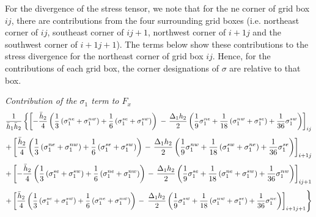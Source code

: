 For the divergence of the stress tensor, we note that for the ne
corner of grid box $ij$, there are contributions from the four
surrounding grid boxes (i.e. northeast corner of $ij$, southeast
corner of $ij+1$, northwest corner of $i+1j$ and the southwest corner
of $i+1j+1$). The terms below show these contributions to the stress
divergence for the northeast corner of grid box $ij$. Hence, for
the contributions of each grid box, the corner designations of
$\sigma$ are relative to that box. 

{\it Contribution of the $\sigma_1$ term to $F_x$}
$$
{1\over \bar{h}_1\bar{h}_2}\left\{ 
\left[-{\bar{h}_2\over 4}\left( 
        {1\over 3}\left(\sigma_1^{ne}+\sigma_1^{nw}\right)  
       +{1\over
6}\left(\sigma_1^{se}+\sigma_1^{sw}\right)\right)\right.\right.
-\left.{\Delta_1h_2\over 2}\left({1\over 9}\sigma_1^{ne}
           +{1\over 18}\left(\sigma_1^{nw}+\sigma_1^{se}\right)
           +{1\over 36}\sigma_1^{sw}\right)\right]_{ij}  $$
$$
+\left[{\bar{h}_2\over 4}\left( 
         {1\over 3}\left(\sigma_1^{ne}+\sigma_1^{nw}\right) 
        +{1\over
6}\left(\sigma_1^{se}+\sigma_1^{sw}\right)\right)\right.
-\left.{\Delta_1h_2\over 2}\left({1\over 9}\sigma_1^{nw}
           +{1\over 18}\left(\sigma_1^{sw}+\sigma_1^{ne}\right)
           +{1\over 36}\sigma_1^{se}\right)\right]_{i+1j} $$
$$
+\left[-{\bar{h}_2\over 4}\left( 
         {1\over 3}\left(\sigma_1^{se}+\sigma_1^{sw}\right) 
        +{1\over
6}\left(\sigma_1^{ne}+\sigma_1^{nw}\right)\right)\right.
-\left.{\Delta_1h_2\over 2}\left({1\over 9}\sigma_1^{se}
           +{1\over 18}\left(\sigma_1^{ne}+\sigma_1^{sw}\right)
           +{1\over 36}\sigma_1^{nw}\right)\right]_{ij+1} $$
$$
+\left[{\bar{h}_2\over 4}\left( 
         {1\over 3}\left(\sigma_1^{se}+\sigma_1^{sw}\right) 
        +{1\over
6}\left(\sigma_1^{ne}+\sigma_1^{nw}\right)\right)\right.
-\left.\left.{\Delta_1h_2\over 2}
      \left({1\over 9}\sigma_1^{sw}
           +{1\over 18}\left(\sigma_1^{nw}+\sigma_1^{se}\right)
           +{1\over 36}\sigma_1^{ne}\right)\right]_{i+1j+1}\right\} $$

